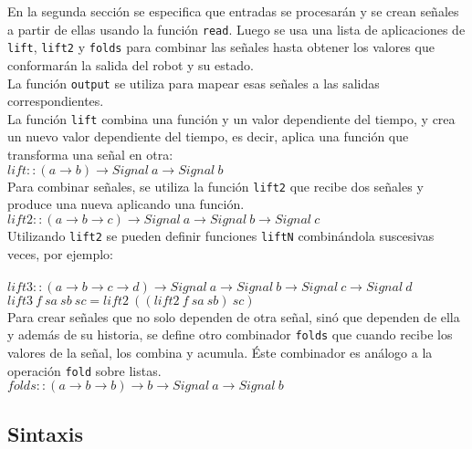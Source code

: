   En la segunda sección se especifica que entradas se procesarán y
se crean señales a partir de ellas usando la función \texttt{read}.
  Luego se usa una lista de aplicaciones de \texttt{lift},
\texttt{lift2} y \texttt{folds} para combinar las señales hasta
obtener los valores que conformarán la salida del robot y su estado.\\
  La función \texttt{output} se utiliza para mapear esas señales a las
salidas correspondientes.\\

  La función \texttt{lift} combina una función y un valor
dependiente del tiempo, y crea un nuevo valor dependiente
del tiempo, es decir, aplica una función que transforma
una señal en otra:\\

$lift :: (a \rightarrow b) \rightarrow Signal\ a \rightarrow Signal\ b$\\

  Para combinar señales, se utiliza la función \texttt{lift2}
que recibe dos señales y produce una nueva aplicando una
función.\\

$lift2 :: (a \rightarrow b \rightarrow c) \rightarrow Signal\ a \rightarrow Signal\ b \rightarrow Signal\ c$\\

Utilizando \texttt{lift2} se pueden definir funciones \texttt{liftN}
combinándola suscesivas veces, por ejemplo:\\
\\
$lift3 :: (a \rightarrow b \rightarrow c \rightarrow d) \rightarrow Signal\ a \rightarrow Signal\ b \rightarrow Signal\ c \rightarrow Signal\ d$\\
$lift3\ f\ sa\ sb\ sc = lift2\ ((lift2\ f\ sa\ sb)\ sc)$\\

Para crear señales que no solo dependen de otra señal, sinó que dependen
de ella y además de su historia, se define otro combinador \texttt{folds}
que cuando recibe los valores de la señal, los combina y acumula. Éste
combinador es análogo a la operación \texttt{fold} sobre listas.\\

$folds :: (a \rightarrow b \rightarrow b) \rightarrow b \rightarrow Signal\ a \rightarrow Signal\ b$\\


\subsection{Sintaxis}

